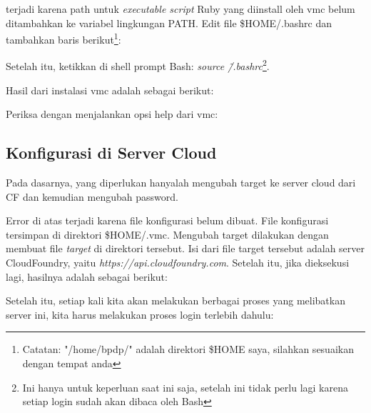 terjadi karena path untuk \textit{executable script} Ruby yang diinstall oleh vmc belum ditambahkan ke variabel lingkungan PATH. Edit file \$HOME/.bashrc dan tambahkan baris berikut\footnote{Catatan: "/home/bpdp/" adalah direktori \$HOME saya, silahkan sesuaikan dengan tempat anda}:
\lstset{language=bash,caption=Peringatan setting PATH untuk vmc}


Setelah itu, ketikkan di shell prompt Bash: \textit{source \~/.bashrc}\footnote{Ini hanya untuk keperluan saat ini saja, setelah ini tidak perlu lagi karena setiap login sudah akan dibaca oleh Bash}.

Hasil dari instalasi vmc adalah sebagai berikut:

\lstset{language=bash,caption=Hasil gem yang terinstall}


Periksa dengan menjalankan opsi help dari vmc:

\lstset{language=bash,caption=Hasil opsi help dari vmc}


\subsection{Konfigurasi di Server Cloud}

Pada dasarnya, yang diperlukan hanyalah mengubah target ke server cloud dari CF dan kemudian mengubah password.

\lstset{language=bash,caption=Mengubah target server - belum ada konfigurasi}


Error di atas terjadi karena file konfigurasi belum dibuat. File konfigurasi tersimpan di direktori \$HOME/.vmc. Mengubah target dilakukan dengan membuat file \textit{target} di direktori tersebut. Isi dari file target tersebut adalah server CloudFoundry, yaitu \textit{https://api.cloudfoundry.com}. Setelah itu, jika dieksekusi lagi, hasilnya adalah sebagai berikut:

\lstset{language=bash,caption=Mengubah target server - setelah konfigurasi}


Setelah itu, setiap kali kita akan melakukan berbagai proses yang melibatkan server ini, kita harus melakukan proses login terlebih dahulu:

\lstset{language=bash,caption=Login ke server}


